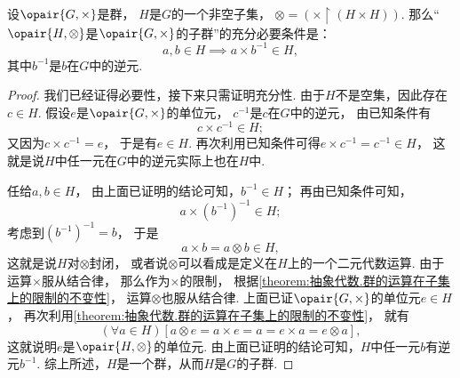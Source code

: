 \begin{theorem}
设\(\opair{G,\times}\)是群，
\(H\)是\(G\)的一个非空子集，
\(\otimes = (\times \upharpoonright(H \times H))\).
那么“\(\opair{H,\otimes}\)是\(\opair{G,\times}\)的子群”的充分必要条件是：\[
	a,b \in H \implies a \times b^{-1} \in H,
\]
其中\(b^{-1}\)是\(b\)在\(G\)中的逆元.
\begin{proof}
我们已经证得必要性，接下来只需证明充分性.
由于\(H\)不是空集，因此存在\(c \in H\).
假设\(e\)是\(\opair{G,\times}\)的单位元，
\(c^{-1}\)是\(c\)在\(G\)中的逆元，
由已知条件有\[
	c \times c^{-1} \in H;
\]
又因为\(c \times c^{-1} = e\)，
于是有\(e \in H\).
再次利用已知条件可得\(e \times c^{-1} = c^{-1} \in H\)，
这就是说\(H\)中任一元在\(G\)中的逆元实际上也在\(H\)中.

任给\(a,b \in H\)，
由上面已证明的结论可知，\(b^{-1} \in H\)；
再由已知条件可知，\[
	a \times (b^{-1})^{-1} \in H;
\]
考虑到\((b^{-1})^{-1} = b\)，
于是\[
	a \times b = a \otimes b \in H,
\]
这就是说\(H\)对\(\otimes\)封闭，
或者说\(\otimes\)可以看成是定义在\(H\)上的一个二元代数运算.
由于运算\(\times\)服从结合律，
那么作为\(\times\)的限制，
根据\cref{theorem:抽象代数.群的运算在子集上的限制的不变性}，
运算\(\otimes\)也服从结合律.
上面已证\(\opair{G,\times}\)的单位元\(e \in H\)，
再次利用\cref{theorem:抽象代数.群的运算在子集上的限制的不变性}，
就有\[
	(\forall a \in H)[
		a \otimes e = a \times e = a = e \times a = e \otimes a
	],
\]
这就说明\(e\)是\(\opair{H,\otimes}\)的单位元.
由上面已证明的结论可知，\(H\)中任一元\(b\)有逆元\(b^{-1}\).
综上所述，\(H\)是一个群，从而\(H\)是\(G\)的子群.
\end{proof}
\end{theorem}

%
%
%

